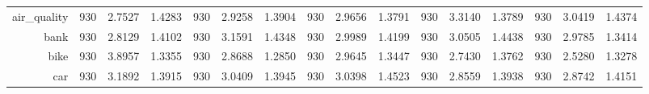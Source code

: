\begin{table}[htbp]
{\begin{tabular}{rccccccccccccccc}
			air\_quality                        & 930                                     & \cellcolor[rgb]{ .776,  .937,  .808}\textcolor[rgb]{ 0,  .38,  0}{2.7527}          & 1.4283          & 930                             & 2.9258                                                                    & 1.3904          & 930                             & 2.9656          & 1.3791          & 930                             & 3.3140                                                                    & 1.3789          & 930                             & 3.0419                                                                    & 1.4374          \\
			bank                                & 930                                     & \cellcolor[rgb]{ .776,  .937,  .808}\textcolor[rgb]{ 0,  .38,  0}{2.8129}          & 1.4102          & 930                             & 3.1591                                                                    & 1.4348          & 930                             & 2.9989          & 1.4199          & 930                             & 3.0505                                                                    & 1.4438          & 930                             & 2.9785                                                                    & 1.3414          \\
			bike                                & 930                                     & 3.8957                                                                             & 1.3355          & 930                             & 2.8688                                                                    & 1.2850          & 930                             & 2.9645          & 1.3447          & 930                             & 2.7430                                                                    & 1.3762          & 930                             & \cellcolor[rgb]{ .776,  .937,  .808}\textcolor[rgb]{ 0,  .38,  0}{2.5280} & 1.3278          \\
			car                                 & 930                                     & 3.1892                                                                             & 1.3915          & 930                             & 3.0409                                                                    & 1.3945          & 930                             & 3.0398          & 1.4523          & 930                             & \cellcolor[rgb]{ .776,  .937,  .808}\textcolor[rgb]{ 0,  .38,  0}{2.8559} & 1.3938          & 930                             & 2.8742                                                                    & 1.4151          \\

\end{tabular}}
\end{table}
